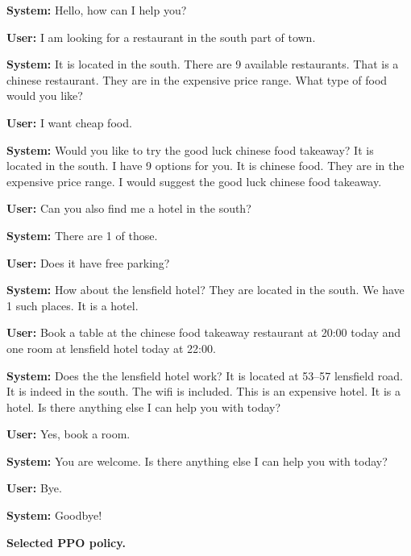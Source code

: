 \documentclass[11pt]{article}
\newcommand{\dialogueturn}[2]{\noindent\textbf{#1:} #2\par\smallskip}
\newcommand{\dialogueheading}[1]{\par\smallskip\noindent\textbf{#1}\par}
\begin{document}
\begingroup
\small
\dialogueturn{System}{Hello, how can I help you?}
\dialogueturn{User}{I am looking for a restaurant in the south part of town.}
\dialogueturn{System}{It is located in the south. There are 9 available
restaurants. That is a chinese restaurant. They are in the expensive price
range. What type of food would you like?}
\dialogueturn{User}{I want cheap food.}
\dialogueturn{System}{Would you like to try the good luck chinese food
takeaway? It is located in the south. I have 9 options for you. It is chinese
food. They are in the expensive price range. I would suggest the good luck
chinese food takeaway.}
\dialogueturn{User}{Can you also find me a hotel in the south?}
\dialogueturn{System}{There are 1 of those.}
\dialogueturn{User}{Does it have free parking?}
\dialogueturn{System}{How about the lensfield hotel? They are located in the
south. We have 1 such places. It is a hotel.}
\dialogueturn{User}{Book a table at the chinese food takeaway restaurant at
20:00 today and one room at lensfield hotel today at 22:00.}
\dialogueturn{System}{Does the the lensfield hotel work? It is located at
53--57 lensfield road. It is indeed in the south. The wifi is included. This is
an expensive hotel. It is a hotel. Is there anything else I can help you with
today?}
\dialogueturn{User}{Yes, book a room.}
\dialogueturn{System}{You are welcome. Is there anything else I can help you
with today?}
\dialogueturn{User}{Bye.}
\dialogueturn{System}{Goodbye!}
\endgroup

\dialogueheading{Selected PPO policy.}
\end{document}
